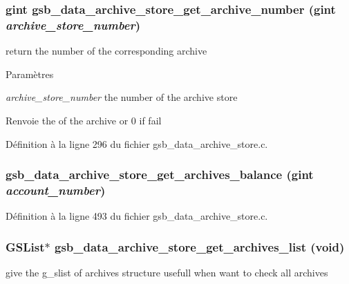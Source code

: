 \subsubsection[{gsb\_\-data\_\-archive\_\-store\_\-get\_\-archive\_\-number}]{\setlength{\rightskip}{0pt plus 5cm}gint gsb\_\-data\_\-archive\_\-store\_\-get\_\-archive\_\-number (gint {\em archive\_\-store\_\-number})}\label{gsb__data__archive__store_8h_aefc4123694ab2b13c39920917b045f18}
return the number of the corresponding archive


\begin{DoxyParams}{Paramètres}
\item[{\em archive\_\-store\_\-number}]the number of the archive store\end{DoxyParams}
\begin{DoxyReturn}{Renvoie}
the of the archive or 0 if fail 
\end{DoxyReturn}


Définition à la ligne 296 du fichier gsb\_\-data\_\-archive\_\-store.c.

\subsubsection[{gsb\_\-data\_\-archive\_\-store\_\-get\_\-archives\_\-balance}]{ gsb\_\-data\_\-archive\_\-store\_\-get\_\-archives\_\-balance (gint {\em account\_\-number})}\label{gsb__data__archive__store_8h_ac1dc6c9d5f8039ac88d633d3bcbd32a5}


Définition à la ligne 493 du fichier gsb\_\-data\_\-archive\_\-store.c.

\subsubsection[{gsb\_\-data\_\-archive\_\-store\_\-get\_\-archives\_\-list}]{\setlength{\rightskip}{0pt plus 5cm}GSList$\ast$ gsb\_\-data\_\-archive\_\-store\_\-get\_\-archives\_\-list (void)}\label{gsb__data__archive__store_8h_aaa582320ef1a27b7c506540b8f43df99}
give the g\_\-slist of archives structure usefull when want to check all archives


